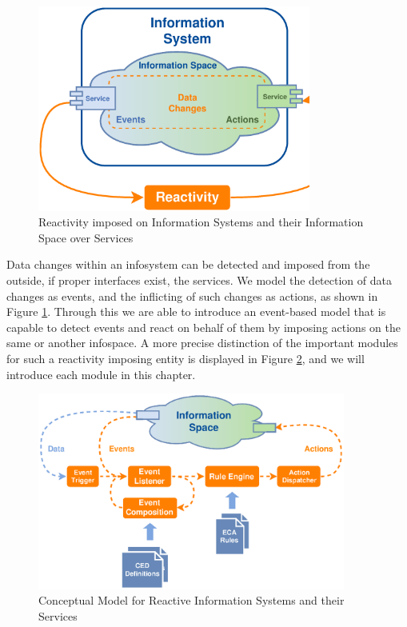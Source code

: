 \begin{figure}[!ht]
  \centering
  \includegraphics[width=0.8\textwidth]{figures/IS_InformationSpace}
  \caption{Reactivity imposed on Information Systems and their Information Space over Services}
  \label{fig:IS_InformationSpace}
\end{figure}
Data changes within an \textrm{\gls{infosystem}} can be detected and imposed from the outside, if proper interfaces exist, the services.
We model the detection of data changes as events, and the inflicting of such changes as actions, as shown in Figure \ref{fig:IS_InformationSpace}.
Through this we are able to introduce an event-based model that is capable to detect events and react on behalf of them by imposing actions on the same or another \textrm{\gls{infospace}}.
A more precise distinction of the important modules for such a reactivity imposing entity is displayed in Figure \ref{fig:Standard-Model-Template}, and we will introduce each module in this chapter.
\begin{figure}[!ht]
  \centering
  \includegraphics[width=0.9\textwidth]{figures/Standard-Model-Template}
  \caption{Conceptual Model for Reactive Information Systems and their Services}
  \label{fig:Standard-Model-Template}
\end{figure}



